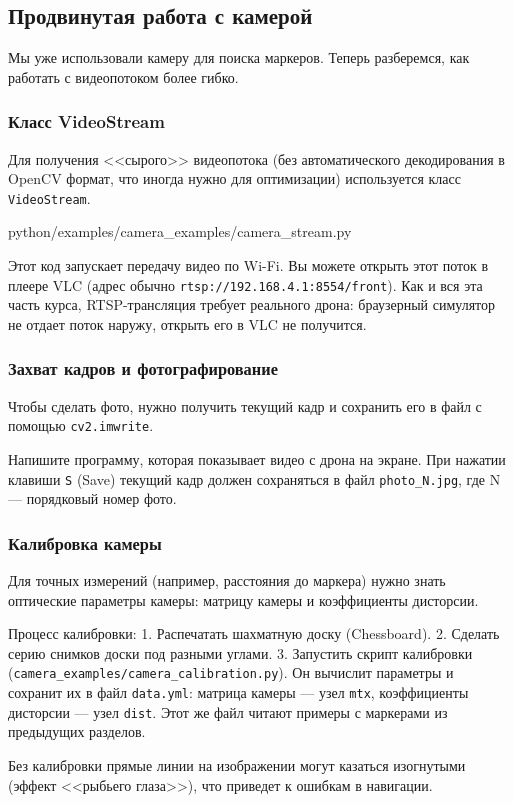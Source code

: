 \subsection{Продвинутая работа с камерой}

Мы уже использовали камеру для поиска маркеров. Теперь разберемся, как работать с видеопотоком более гибко.

\subsubsection*{Класс VideoStream}
Для получения <<сырого>> видеопотока (без автоматического декодирования в OpenCV формат, что иногда нужно для оптимизации) используется класс \texttt{VideoStream}.

\begin{codefile}[python]{python/examples/camera_examples/camera_stream.py}
\end{codefile}

Этот код запускает передачу видео по Wi-Fi. Вы можете открыть этот поток в плеере VLC (адрес обычно \texttt{rtsp://192.168.4.1:8554/front}). Как и вся эта часть курса, RTSP-трансляция требует реального дрона: браузерный симулятор не отдает поток наружу, открыть его в VLC не получится.

\subsubsection*{Захват кадров и фотографирование}
Чтобы сделать фото, нужно получить текущий кадр и сохранить его в файл с помощью \texttt{cv2.imwrite}.

\begin{taskbox}[Фотограф]
Напишите программу, которая показывает видео с дрона на экране. При нажатии клавиши \texttt{S} (Save) текущий кадр должен сохраняться в файл \texttt{photo\_N.jpg}, где N — порядковый номер фото.
\end{taskbox}

\subsubsection*{Калибровка камеры}
Для точных измерений (например, расстояния до маркера) нужно знать оптические параметры камеры: матрицу камеры и коэффициенты дисторсии.

Процесс калибровки:
1. Распечатать шахматную доску (Chessboard).
2. Сделать серию снимков доски под разными углами.
3. Запустить скрипт калибровки (\texttt{camera\_examples/camera\_calibration.py}). Он вычислит параметры и сохранит их в файл \texttt{data.yml}: матрица камеры --- узел \texttt{mtx}, коэффициенты дисторсии --- узел \texttt{dist}. Этот же файл читают примеры с маркерами из предыдущих разделов.

\begin{infobox}
Без калибровки прямые линии на изображении могут казаться изогнутыми (эффект <<рыбьего глаза>>), что приведет к ошибкам в навигации.
\end{infobox}
